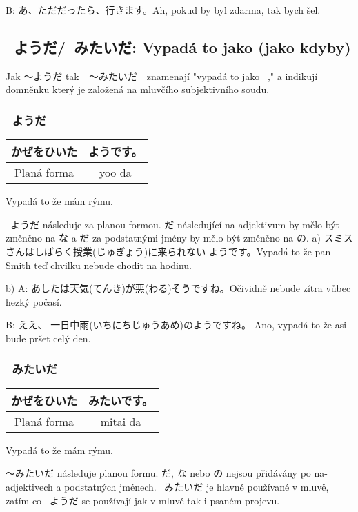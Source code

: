 B: あ、ただだったら、行きます。Ah, pokud by byl zdarma, tak bych šel.


\subsection{ ~ようだ/~みたいだ: Vypadá to jako  (jako kdyby)}
Jak 〜ようだ tak　〜みたいだ　znamenají "vypadá to jako  ~," a indikují domněnku který je založená na mluvčího subjektivního soudu.

\subsubsection{ ~ようだ}
\begin{center}
\begin{tabular}{|c|c|}
\hline
かぜをひいた&ようです。\\
\hline
Planá forma&yoo da\\
\hline
\end{tabular}
\end{center}
Vypadá to že mám rýmu.




 ~ようだ následuje za planou formou.  だ následující na-adjektivum by mělo být změněno na な a だ za podstatnými jmény by mělo být změněno na  の.
a) スミスさんはしばらく授業(じゅぎょう)に来られない ようです。Vypadá to že pan Smith teď chvilku nebude chodit na hodinu.

b) A: あしたは天気(てんき)が悪(わる)そうですね。Očividně nebude zítra vůbec hezký počasí.


B: ええ、 一日中雨(いちにちじゅうあめ)のようですね。 Ano, vypadá to že asi bude pršet celý den.




\subsubsection{ ~みたいだ}
\begin{center}
\begin{tabular}{|c|c|}
\hline
かぜをひいた&みたいです。 \\
\hline
Planá forma&mitai da\\
\hline
\end{tabular}
\end{center}
Vypadá to že mám rýmu.


〜みたいだ následuje planou formu.  だ, な nebo の nejsou přidávány po na-adjektivech a podstatných jménech. ~みたいだ je hlavně používané v mluvě, zatím co  ~ようだ  se používají jak v mluvě tak i psaném projevu.

